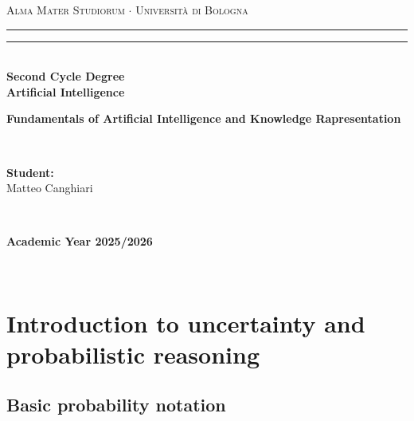 \documentclass[12pt,a4paper,twoside]{book}
\begin{document}
\pagestyle{empty}
\begin{titlepage}
\begin{center}
    {{\Large{\textsc{Alma Mater Studiorum $\cdot$ Università di Bologna}}}}
    \rule[0.1cm]{\textwidth}{0.1mm}
    \rule[0.5cm]{\textwidth}{0.6mm}\\
    {\small{\bf Second Cycle Degree\\
    Artificial Intelligence}}
\end{center}

\vspace{45mm}

\begin{center}
    \textbf{Fundamentals of Artificial Intelligence and Knowledge Rapresentation}
\end{center}

\vspace{60mm}
\par
\noindent
\begin{minipage}[t]{0.04\textwidth}
~
\end{minipage}
\begin{minipage}[t]{0.4\textwidth}
{{\textbf{Student:}\\
Matteo Canghiari}}
\end{minipage}
\begin{minipage}[t]{0.04\textwidth}
~
\end{minipage}

\vspace{30mm}

\begin{center}
    {\large{\bf Academic Year 2025/2026}}
\end{center}
\end{titlepage}

\restoregeometry

\pagestyle{empty}
\newpage~\newpage
\thispagestyle{empty}

\clearpage
{}
\pagestyle{plain}

\chapter{Introduction to uncertainty and probabilistic reasoning}

\label{c_1}

\section{Basic probability notation}

\label{s_1_1}
\end{document}
